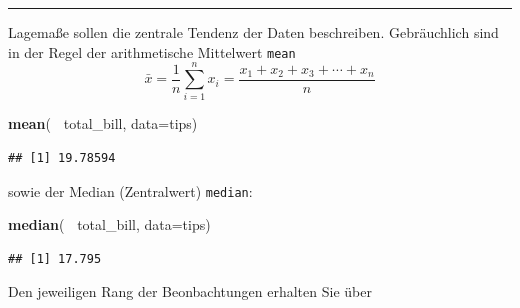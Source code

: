\documentclass[12pt,ngerman,paper=a4,pagesize,DIV=13]{scrreprt}
\newenvironment{Shaded}{\begin{snugshade}}{\end{snugshade}}
\newcommand{\DataTypeTok}[1]{\textcolor[rgb]{0.13,0.29,0.53}{#1}}
\newcommand{\KeywordTok}[1]{\textcolor[rgb]{0.13,0.29,0.53}{\textbf{#1}}}
\newcommand{\NormalTok}[1]{#1}
\newcommand{\OperatorTok}[1]{\textcolor[rgb]{0.81,0.36,0.00}{\textbf{#1}}}
\newcommand{\StringTok}[1]{\textcolor[rgb]{0.31,0.60,0.02}{#1}}
\begin{document}
\begin{center}\rule{0.5\linewidth}{\linethickness}\end{center}

Lagemaße sollen die zentrale Tendenz der Daten beschreiben. Gebräuchlich
sind in der Regel der arithmetische Mittelwert \texttt{mean}
\[\bar{x}=\frac{1}{n}\sum_{i=1}^{n}x_i=\frac{x_1+x_2+x_3+\cdots+x_n}{n}\]

\begin{Shaded}
\begin{Highlighting}[]
\KeywordTok{mean}\NormalTok{(}\OperatorTok{~}\StringTok{ }\NormalTok{total_bill, }\DataTypeTok{data=}\NormalTok{tips)}
\end{Highlighting}
\end{Shaded}

\begin{verbatim}
## [1] 19.78594
\end{verbatim}

sowie der Median (Zentralwert) \texttt{median}:

\begin{Shaded}
\begin{Highlighting}[]
\KeywordTok{median}\NormalTok{(}\OperatorTok{~}\StringTok{ }\NormalTok{total_bill, }\DataTypeTok{data=}\NormalTok{tips)}
\end{Highlighting}
\end{Shaded}

\begin{verbatim}
## [1] 17.795
\end{verbatim}

Den jeweiligen Rang der Beonbachtungen erhalten Sie über

\begin{Shaded}
\end{Shaded}
\end{document}
